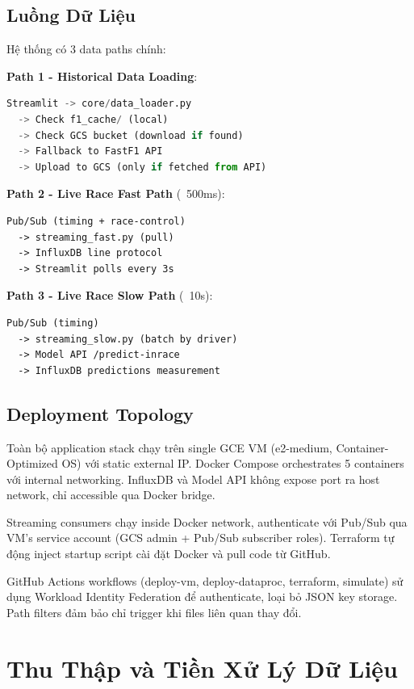 \documentclass[conference,10pt]{IEEEtran}
\begin{document}
\subsection{Luồng Dữ Liệu}

Hệ thống có 3 data paths chính:

\textbf{Path 1 - Historical Data Loading}:
\begin{lstlisting}[language=Python]
Streamlit -> core/data_loader.py
  -> Check f1_cache/ (local)
  -> Check GCS bucket (download if found)
  -> Fallback to FastF1 API
  -> Upload to GCS (only if fetched from API)
\end{lstlisting}

\textbf{Path 2 - Live Race Fast Path} (~500ms):
\begin{lstlisting}
Pub/Sub (timing + race-control)
  -> streaming_fast.py (pull)
  -> InfluxDB line protocol
  -> Streamlit polls every 3s
\end{lstlisting}

\textbf{Path 3 - Live Race Slow Path} (~10s):
\begin{lstlisting}
Pub/Sub (timing)
  -> streaming_slow.py (batch by driver)
  -> Model API /predict-inrace
  -> InfluxDB predictions measurement
\end{lstlisting}

\subsection{Deployment Topology}

Toàn bộ application stack chạy trên single GCE VM (e2-medium, Container-Optimized OS) với static external IP. Docker Compose orchestrates 5 containers với internal networking. InfluxDB và Model API không expose port ra host network, chỉ accessible qua Docker bridge.

Streaming consumers chạy inside Docker network, authenticate với Pub/Sub qua VM's service account (GCS admin + Pub/Sub subscriber roles). Terraform tự động inject startup script cài đặt Docker và pull code từ GitHub.

GitHub Actions workflows (deploy-vm, deploy-dataproc, terraform, simulate) sử dụng Workload Identity Federation để authenticate, loại bỏ JSON key storage. Path filters đảm bảo chỉ trigger khi files liên quan thay đổi.

\section{Thu Thập và Tiền Xử Lý Dữ Liệu}
\end{document}
